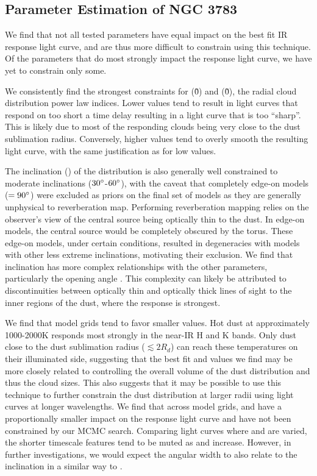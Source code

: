 \subsection{Parameter Estimation of NGC 3783}
\par We find that not all tested parameters have equal impact on the best fit IR response light curve, and are thus more difficult to constrain using this technique. Of the parameters that do most strongly impact the response light curve, we have yet to constrain only some. 
\par We consistently find the strongest constraints for \p (\~0) and \ppol (\~0), the radial cloud distribution power law indices. Lower \p values tend to result in light curves that respond on too short a time delay resulting in a light curve that is too “sharp”. This is likely due to most of the responding clouds being very close to the dust sublimation radius. Conversely, higher \p values tend to overly smooth the resulting light curve, with the same justification as for low \p values.  
\par The inclination (\inc) of the distribution is also generally well constrained to moderate inclinations ($30\degree$-$60\degree$), with the caveat that completely edge-on models (\inc $=90\degree$) were excluded as priors on the final set of models as they are generally unphysical to reverberation map. Performing reverberation mapping relies on the observer’s view of the central source being optically thin to the dust. In edge-on models, the central source would be completely obscured by the torus. These edge-on models, under certain conditions, resulted in degeneracies with models with other less extreme inclinations, motivating their exclusion. We find that inclination has more complex relationships with the other parameters, particularly the opening angle \open. This complexity can likely be attributed to discontinuities between optically thin and optically thick lines of sight to the inner regions of the dust, where the response is strongest.
\par We find that model grids tend to favor smaller \Y values. Hot dust at approximately 1000-2000K responds most strongly in the near-IR H and K bands. Only dust close to the dust sublimation radius ($\lesssim2R_d$) can reach these temperatures on their illuminated side, suggesting that the best fit \Y and \Ypol values we find may be more closely related to controlling the overall volume of the dust distribution and thus the cloud sizes. This also suggests that it may be possible to use this technique to further constrain the dust distribution at larger radii using light curves at longer wavelengths. 
We find that across model grids, \sig and \sigpol have a proportionally smaller impact on the response light curve and have not been constrained by our MCMC search. Comparing light curves where \sig and \sigpol are varied, the shorter timescale features tend to be muted as \sig and \sigpol increase. However, in further investigations, we would expect the angular width to also relate to the inclination in a similar way to \open. 

